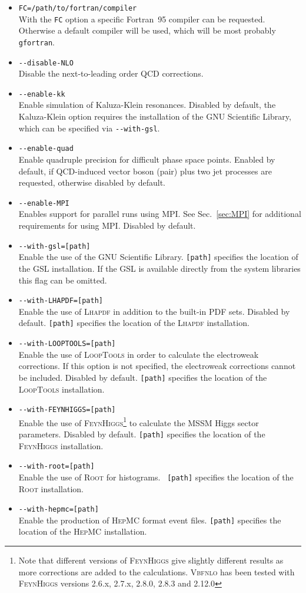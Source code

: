 \documentclass[english,12pt]{article}
\begin{document}
\begin{itemize}
\item {\tt FC=/path/to/fortran/compiler} \\ With the {\tt FC} option a specific {\sc Fortran}~95 compiler
      can be requested. Otherwise a default compiler will be used, which will be most probably {\tt gfortran}.
\item {\tt -{}-disable-NLO} \\ Disable the next-to-leading order QCD
corrections.  
\item {\tt -{}-enable-kk} \\ Enable simulation of Kaluza-Klein resonances.
Disabled by default, the Kaluza-Klein option requires the installation of the
GNU Scientific Library, which can be specified via {\tt -{}-with-gsl}. 
\item {\tt -{}-enable-quad} \\ Enable quadruple precision for difficult phase space points.
Enabled by default, if QCD-induced vector boson (pair) plus two jet processes
are requested, otherwise disabled by default.
\item {\tt -{}-enable-MPI} \\ Enables support for parallel runs using MPI. See
  Sec.~\ref{sec:MPI} for additional requirements for using MPI.
Disabled by default.
\item {\tt -{}-with-gsl=[path]} \\ Enable the use of the GNU
Scientific Library. {\tt [path]} specifies the location of the GSL installation.
If the GSL is available directly from the system libraries this flag can be omitted.
\item {\tt -{}-with-LHAPDF=[path]} \\ Enable the use of \textsc{Lhapdf} in addition to the
built-in PDF sets.  Disabled by default. {\tt [path]} specifies the location of
the \textsc{Lhapdf} installation. 
\item {\tt -{}-with-LOOPTOOLS=[path]} \\ Enable the use of
\textsc{LoopTools} in order to calculate the electroweak corrections. 
If this option is not specified, the electroweak corrections cannot be included.
Disabled by default. {\tt [path]} specifies the location of the \textsc{LoopTools}
installation. 
\item {\tt -{}-with-FEYNHIGGS=[path]} \\ Enable the use of
\textsc{FeynHiggs}\footnote{Note that different versions of \textsc{FeynHiggs}
give slightly different results as more corrections are added to the
calculations.  \textsc{Vbfnlo} has been tested with \textsc{FeynHiggs} versions
2.6.x, 2.7.x, 2.8.0, 2.8.3 and 2.12.0} to calculate the MSSM Higgs sector parameters.
Disabled by default. {\tt [path]} specifies the location of the
\textsc{FeynHiggs} installation. 
\item  {\tt -{}-with-root=[path]} \\ Enable the use of \textsc{Root} for histograms.  {\tt
[path]} specifies the location of the \textsc{Root} installation.
\item {\tt -{}-with-hepmc=[path]} \\ Enable the production of \textsc{HepMC}
format event files.  {\tt [path]} specifies the location of the \textsc{HepMC}
installation.


\end{itemize}
\end{document}
